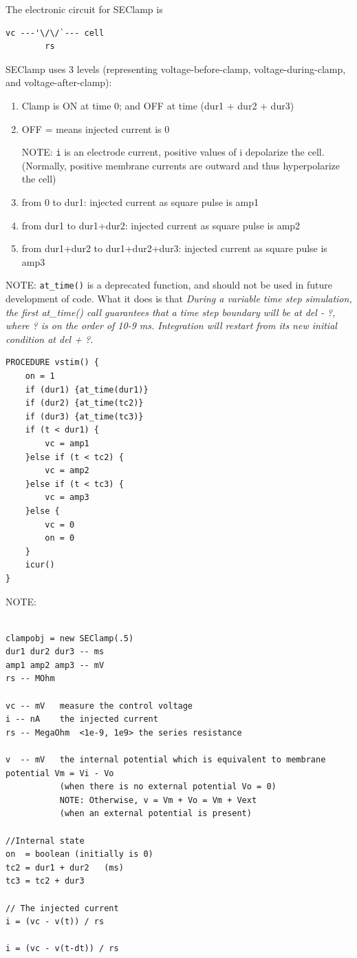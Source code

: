 The electronic circuit for SEClamp is
\begin{verbatim}
vc ---'\/\/`--- cell
        rs
\end{verbatim}


SEClamp uses 3 levels (representing voltage-before-clamp, voltage-during-clamp,
and voltage-after-clamp):
\begin{enumerate}
  \item Clamp is ON at time 0; and OFF at time (dur1 + dur2 + dur3)
  \item OFF = means injected current is 0
  
NOTE: \verb!i! is an electrode current, positive values of i depolarize the
cell. (Normally, positive membrane currents are outward and thus hyperpolarize
the cell)

  \item from 0 to dur1: injected current as square pulse is amp1
  
  \item from dur1 to dur1+dur2: injected current as square pulse is amp2
  
  \item from dur1+dur2 to dur1+dur2+dur3: injected current as square pulse is
  amp3
\end{enumerate}

NOTE: \verb!at_time()! is a deprecated function, and should not be used in
future development of code. What it does is that 
{\it During a variable time step simulation, the first at\_time() call 
guarantees that a time step boundary will be at del - ?, where ? is on the 
order of 10-9 ms. Integration will restart from its new initial condition 
at del + ?.} 

\begin{verbatim}
PROCEDURE vstim() {
	on = 1
	if (dur1) {at_time(dur1)}
	if (dur2) {at_time(tc2)}
	if (dur3) {at_time(tc3)}
	if (t < dur1) {
		vc = amp1
	}else if (t < tc2) {
		vc = amp2
	}else if (t < tc3) {
		vc = amp3
	}else {
		vc = 0
		on = 0
	}
	icur()
}
\end{verbatim}

NOTE:
\begin{verbatim}

clampobj = new SEClamp(.5)
dur1 dur2 dur3 -- ms
amp1 amp2 amp3 -- mV
rs -- MOhm

vc -- mV   measure the control voltage
i -- nA    the injected current
rs -- MegaOhm  <1e-9, 1e9> the series resistance

v  -- mV   the internal potential which is equivalent to membrane potential Vm = Vi - Vo
           (when there is no external potential Vo = 0) 
           NOTE: Otherwise, v = Vm + Vo = Vm + Vext
           (when an external potential is present)

//Internal state
on  = boolean (initially is 0)
tc2 = dur1 + dur2   (ms)
tc3 = tc2 + dur3

// The injected current 
i = (vc - v(t)) / rs 

i = (vc - v(t-dt)) / rs
\end{verbatim}



